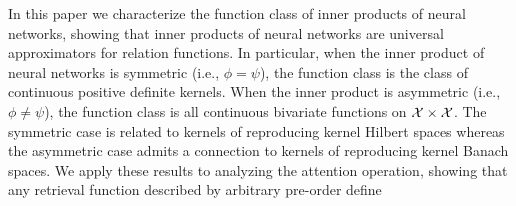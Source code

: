 In this paper we characterize the function class of inner products of neural networks, showing that inner products of neural networks are universal approximators for relation functions. In particular, when the inner product of neural networks is symmetric (i.e., $\phi=\psi$), the function class is the class of continuous positive definite kernels. When the inner product is asymmetric (i.e., $\phi \neq \psi$), the function class is all continuous bivariate functions on ${\mathcal{X}} \times {\mathcal{X}}$. The symmetric case is related to kernels of reproducing kernel Hilbert spaces whereas the asymmetric case admits a connection to kernels of reproducing kernel Banach spaces. We apply these results to analyzing the attention operation, showing that any retrieval function described by arbitrary pre-order define 
